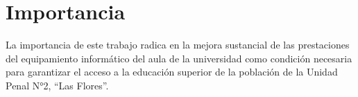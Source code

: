\chapter{Importancia}\label{ch:importancia}
    La importancia de este trabajo radica en la mejora sustancial de las 
    prestaciones del equipamiento informático del aula de la universidad como 
    condición necesaria  para garantizar el acceso a la educación superior de la 
    población de la Unidad Penal N°2, “Las Flores”.\par
